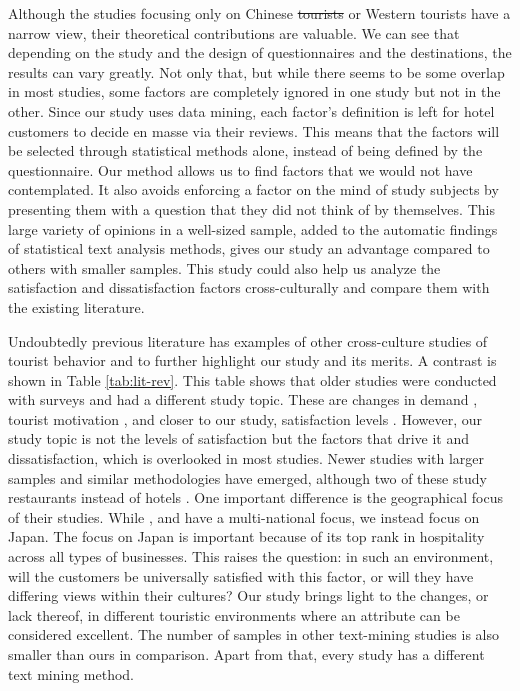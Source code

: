 \documentclass[smallextended,natbib]{svjour3}       %
\providecommand{\DIFadd}[1]{{\protect\color{blue}\uwave{#1}}} %
\providecommand{\DIFdel}[1]{{\protect\color{red}\sout{#1}}}                      %
\providecommand{\DIFaddbegin}{} %
\providecommand{\DIFaddend}{} %
\providecommand{\DIFdelbegin}{} %
\providecommand{\DIFdelend}{} %
\newcommand{\DIFscaledelfig}{0.5}
\newlength{\DIFdelgraphicswidth} %
\newlength{\DIFdelgraphicsheight} %
\newcommand{\DIFaddincludegraphics}[2][]{{\color{blue}\fbox{\DIFOincludegraphics[#1]{#2}}}} %
\newcommand{\DIFdelincludegraphics}[2][]{%
\sbox{\DIFdelgraphicsbox}{\DIFOincludegraphics[#1]{#2}}%
\settoboxwidth{\DIFdelgraphicswidth}{\DIFdelgraphicsbox} %
\settoboxtotalheight{\DIFdelgraphicsheight}{\DIFdelgraphicsbox} %
\scalebox{\DIFscaledelfig}{%
\parbox[b]{\DIFdelgraphicswidth}{\usebox{\DIFdelgraphicsbox}\\[-\baselineskip] \rule{\DIFdelgraphicswidth}{0em}}\llap{\resizebox{\DIFdelgraphicswidth}{\DIFdelgraphicsheight}{%
\setlength{\unitlength}{\DIFdelgraphicswidth}%
\begin{picture}(1,1)%
\thicklines\linethickness{2pt} %
{\color[rgb]{1,0,0}\put(0,0){\framebox(1,1){}}}%
{\color[rgb]{1,0,0}\put(0,0){\line( 1,1){1}}}%
{\color[rgb]{1,0,0}\put(0,1){\line(1,-1){1}}}%
\end{picture}%
}\hspace*{3pt}}} %
} %
\DeclareRobustCommand{\DIFaddbegin}{\DIFOaddbegin \let\includegraphics\DIFaddincludegraphics} %
\DeclareRobustCommand{\DIFaddend}{\DIFOaddend \let\includegraphics\DIFOincludegraphics} %
\DeclareRobustCommand{\DIFdelbegin}{\DIFOdelbegin \let\includegraphics\DIFdelincludegraphics} %
\DeclareRobustCommand{\DIFdelend}{\DIFOaddend \let\includegraphics\DIFOincludegraphics} %
\begin{document}
    Although the studies focusing only on Chinese \DIFdelbegin \DIFdel{tourists }\DIFdelend or Western tourists have a narrow view, their theoretical contributions are valuable. We can see that depending on the study and the design of questionnaires and the destinations, the results can vary greatly. Not only that, but while there seems to be some overlap in most studies, some factors are completely ignored in one study but not in the other. Since our study uses data mining, each factor's definition is left for hotel customers to decide en masse via their reviews. This means that the factors will be selected through statistical methods alone, instead of being defined by the questionnaire. Our method allows us to find factors that we would not have contemplated. It also avoids enforcing a factor on the mind of study subjects by presenting them with a question that they did not think of by themselves. This large variety of opinions in a well-sized sample, added to the automatic findings of statistical text analysis methods, gives our study an advantage compared to others with smaller samples. This study could also help us analyze the satisfaction and dissatisfaction factors cross-culturally and compare them with the existing literature.

    Undoubtedly previous literature has examples of other cross-culture studies of tourist behavior and \DIFaddbegin \DIFadd{may serve }\DIFaddend to further highlight our study and its merits. A contrast is shown in Table \ref{tab:lit-rev}. This table shows that older studies were conducted with surveys and had a different study topic. These are changes in demand \cite[][]{bauer1993changing}, tourist motivation \cite[][]{kim2000}, and closer to our study, satisfaction levels \cite[][]{choi2000}. However, our study topic is not the levels of satisfaction but the factors that drive it and dissatisfaction, which is overlooked in most studies. Newer studies with larger samples and similar methodologies have emerged, although two of these study restaurants instead of hotels \cite[][]{JIA2020104071, HUANG2017117}. One important difference is the geographical focus of their studies. While \cite{FRANCESCO201924} , \cite{JIA2020104071} and \cite{HUANG2017117} have a multi-national focus, we instead focus on Japan. The focus on Japan is important because of its top rank in hospitality across all types of businesses. This raises the question: in such an environment, will the customers be universally satisfied with this factor, or will they have differing views within their cultures? Our study brings light to the changes, or lack thereof, in different touristic environments where an attribute can be considered excellent. The number of samples in other text-mining studies is also smaller than ours in comparison. Apart from that, every study has a different text mining method.
\end{document}
